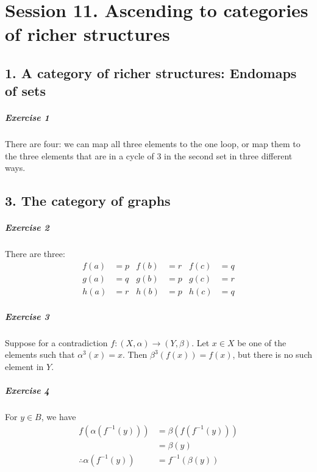 \documentclass{report}
\newcommand{\inv}[1]{\ensuremath{{#1}^{-1}}}
\begin{document}
    \chapter{Session 11. Ascending to categories of richer structures}

    \section{1. A category of richer structures: Endomaps of sets}

    \paragraph{Exercise 1}
    There are four: we can map all three elements to the one loop, or map them to the three elements that are
    in a cycle of 3 in the second set in three different ways.

    \section{3. The category of graphs}

    \paragraph{Exercise 2}
    There are three:
    \begin{align*}
        f(a) & = p & f(b) & = r & f(c) & = q \\
        g(a) & = q & g(b) & = p & g(c) & = r \\
        h(a) & = r & h(b) & = p & h(c) & = q
    \end{align*}

    \paragraph{Exercise 3}
    Suppose for a contradiction $f : (X, \alpha) \rightarrow (Y, \beta)$. Let $x \in X$ be one of the
    elements such that $\alpha^3(x) = x$. Then $\beta^3(f(x)) = f(x)$, but there is no such element in $Y$.

    \paragraph{Exercise 4}
    For $y \in B$, we have
    \begin{align*}
        f(\alpha(\inv{f}(y))) & = \beta(f(\inv{f}(y))) \\
        & = \beta(y) \\
        \therefore \alpha(\inv{f}(y)) & = \inv{f}(\beta(y))
    \end{align*}
\end{document}
